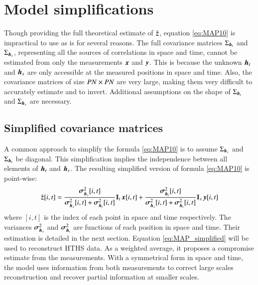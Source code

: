 \section{Model simplifications}
Though providing the full theoretical estimate of $ \hat{\operatorname{\boldsymbol{z}} } $, equation \ref{eq:MAP10} is impractical to use as is for several reasons. The full covariance matrices $ \Sigma_{\operatorname{\boldsymbol{h}}_t} $ and $ \Sigma_{\operatorname{\boldsymbol{h}}_s} $, representing all the sources of correlations in space and time, cannot be estimated from only the measurements $ \operatorname{\boldsymbol{x}}  $ and $ \operatorname{\boldsymbol{y}} $. This is because the unknown $ \operatorname{\boldsymbol{h}}_t $ and $ \operatorname{\boldsymbol{h}}_s $ are only accessible at the measured positions in space and time. Also, the covariance matrices of size $ P N \times P N $ are very large, making them very difficult to accurately estimate and to invert. Additional assumptions on the shape of $ \Sigma_{\operatorname{\boldsymbol{h}}_t} $ and $ \Sigma_{\operatorname{\boldsymbol{h}}_s} $ are necessary. 
 
\subsection{\label{subsec:simplified_fusion_model} Simplified covariance matrices}
A common approach to simplify the formula \ref{eq:MAP10} is to assume $ \Sigma_{\operatorname{\boldsymbol{h}}_s} $ and $ \Sigma_{\operatorname{\boldsymbol{h}}_t} $ be diagonal. This simplification implies the independence between all elements of $ \operatorname{\boldsymbol{h}}_t $ and $ \operatorname{\boldsymbol{h}}_s $. The resulting simplified version of formula \ref{eq:MAP10} is point-wise:
\begin{equation}	
	\hat{\z }[i,t]=\frac{\mybold{\sigma}^2_{\h_s}[i,t]}{\mybold{\sigma}^2_{\h_s}[i,t]+\mybold{\sigma}^2_{\h_t}[i,t]}\Interp_t\x [i,t]+\frac{\mybold{\sigma}^2_{\h_t}[i,t]}{\mybold{\sigma}^2_{\h_s}[i,t]+\mybold{\sigma}^2_{\h_t}[i,t]}\Interp_s\y [i,t]
\label{eq:MAP_simplified}	
\end{equation}
where  $ [i,t] $ is the index of each point in space and time respectively. The variances $ \operatorname{\boldsymbol{\sigma}}^2_{\operatorname{\boldsymbol{h}}_s} $ and $ \operatorname{\boldsymbol{\sigma}}^2_{\operatorname{\boldsymbol{h}}_t} $ are functions of each position in space and time. Their estimation is detailed in the next section. Equation \ref{eq:MAP_simplified} will be used to reconstruct HTHS data. As a weighted average, it proposes a compromise estimate from the measurements. With a symmetrical form in space and time, the model uses information from both measurements to correct large scales reconstruction and recover partial information at smaller scales. 

